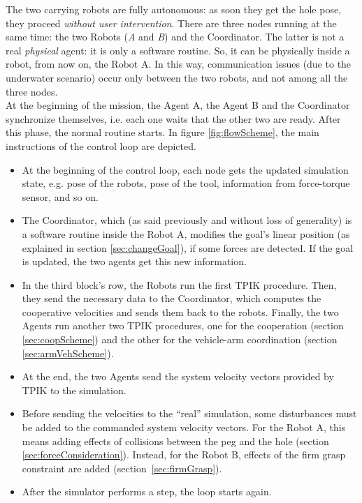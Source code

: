 The two carrying robots are fully autonomous: as soon they get the hole pose, they proceed \textit{without user intervention}. There are three nodes running at the same time: the two Robots (\textit{A} and \textit{B}) and the Coordinator. The latter is not a real \textit{physical} agent: it is only a software routine. So, it can be physically inside a robot, from now on, the Robot A. In this way, communication issues (due to the underwater scenario) occur only between the two robots, and not among all the three nodes.\\

At the beginning of the mission, the Agent A, the Agent B and the Coordinator synchronize themselves, i.e. each one waits that the other two are ready. After this phase, the normal routine starts. In figure \ref{fig:flowScheme}, the main instructions of the control loop are depicted.

\begin{itemize}
	\item At the beginning of the control loop, each node gets the updated simulation state, e.g. pose of the robots, pose of the tool, information from force-torque sensor, and so on.
	
	\item The Coordinator, which (as said previously and without loss of generality) is a software routine inside the Robot A, modifies the goal's linear position (as explained in section \ref{sec:changeGoal}), if some forces are detected. If the goal is updated, the two agents get this new information.
	
	\item In the third block's row, the Robots run the first TPIK procedure. Then, they send the necessary data to the Coordinator, which computes the cooperative velocities and sends them back to the robots. Finally, the two Agents run another two TPIK procedures, one for the cooperation (section \ref{sec:coopScheme}) and the other for the vehicle-arm coordination (section \ref{sec:armVehScheme}).
	
	\item At the end, the two Agents send the system velocity vectors provided by TPIK to the simulation.
	
	\item Before sending the velocities to the \enquote{real} simulation, some disturbances must be added to the commanded system velocity vectors. For the Robot A, this means adding effects of collisions between the peg and the hole (section \ref{sec:forceConsideration}). Instead, for the Robot B, effects of the firm grasp constraint are added (\mbox{section \ref{sec:firmGrasp}).}
	
	\item After the simulator performs a step, the loop starts again.
	
\end{itemize}

